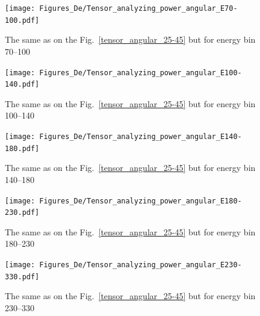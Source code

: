     \begin{figure}[h]
        \begin{center}
        \texttt{[image: Figures\_De/Tensor\_analyzing\_power\_angular\_E70-100.pdf]}
        \end{center}
        \caption{The same as on the Fig.~\ref*{tensor_angular_25-45} but for energy bin \SIrange{70}{100}{\mev}}
        \label{tensor_angular_70-100}
    \end{figure}        

    \begin{figure}[h]
        \begin{center}
        \texttt{[image: Figures\_De/Tensor\_analyzing\_power\_angular\_E100-140.pdf]}
        \end{center}
        \caption{The same as on the Fig.~\ref*{tensor_angular_25-45} but for energy bin \SIrange{100}{140}{\mev}}
        \label{tensor_angular_100-140}
    \end{figure}
        
        

    \begin{figure}[h]
        \begin{center}
        \texttt{[image: Figures\_De/Tensor\_analyzing\_power\_angular\_E140-180.pdf]}
        \end{center}
        \caption{The same as on the Fig.~\ref*{tensor_angular_25-45} but for energy bin \SIrange{140}{180}{\mev}}
        \label{tensor_angular_140-180}
    \end{figure}
        

    \begin{figure}[h]
        \begin{center}
        \texttt{[image: Figures\_De/Tensor\_analyzing\_power\_angular\_E180-230.pdf]}
        \end{center}
        \caption{The same as on the Fig.~\ref*{tensor_angular_25-45} but for energy bin \SIrange{180}{230}{\mev}}
        \label{tensor_angular_180-230}
    \end{figure}

    \begin{figure}[h]
        \begin{center}
        \texttt{[image: Figures\_De/Tensor\_analyzing\_power\_angular\_E230-330.pdf]}
        \end{center}
        \caption{The same as on the Fig.~\ref*{tensor_angular_25-45} but for energy bin \SIrange{230}{330}{\mev}}
        \label{tensor_angular_230-330}
    \end{figure}
        


